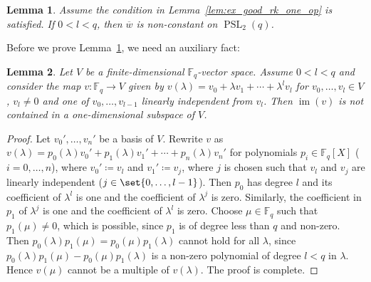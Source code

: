 \documentclass[a4paper,11pt]{amsproc}
\newcommand{\finfield}{\mathbb{F}}%
\DeclareMathOperator{\PSL}{PSL}%
\DeclareMathOperator{\im}{im}%
\theoremstyle{plain}
\newtheorem{lemma}{Lemma}[section]
\theoremstyle{definition}
\begin{document}
	\begin{lemma}\label{lem:poly_mthd}
		Assume the condition in Lemma~\ref{lem:ex_good_rk_one_op} is satisfied. If $0<l<q$, then $\overline{w}$ is non-constant on $\PSL_2(q)$.
	\end{lemma}
	
	Before we prove Lemma~\ref{lem:poly_mthd}, we need an auxiliary fact:
	
	\begin{lemma}\label{lem:poly_non_const}
		Let $V$ be a finite-dimensional $\finfield_q$-vector space. Assume $0<l<q$ and consider the map $v\colon \finfield_q\to V$ given by $v(\lambda)=v_0+\lambda v_1+\cdots+\lambda^l v_l$ for $v_0,\ldots,v_l\in V$, $v_l\neq 0$ and one of $v_0,\ldots,v_{l-1}$ linearly independent from $v_l$. Then $\im(v)$ is not contained in a one-dimensional subspace of $V$.
	\end{lemma}
	
	\begin{proof}
		Let $v_0',\ldots,v_n'$ be a basis of $V$. Rewrite $v$ as $v(\lambda)=p_0(\lambda)v_0'+p_1(\lambda)v_1'+\cdots+p_n(\lambda)v_n'$ for polynomials $p_i\in\finfield_q[X]$ ($i=0,\ldots,n$), where $v_0'\coloneqq v_l$ and $v_1'\coloneqq v_j$, where $j$ is chosen such that $v_l$ and $v_j$ are linearly independent ($j\in\set{0,\ldots,l-1}$). Then $p_0$ has degree $l$ and its coefficient of $\lambda^l$ is one and the coefficient of $\lambda^j$ is zero. Similarly, the coefficient in $p_1$ of $\lambda^j$ is one and the coefficient of $\lambda^l$ is zero.
		Choose $\mu\in\finfield_q$ such that $p_1(\mu)\neq 0$, which is possible, since $p_1$ is of degree less than $q$ and non-zero. Then $p_0(\lambda)p_1(\mu)=p_0(\mu)p_1(\lambda)$ cannot hold for all $\lambda$, since $p_0(\lambda)p_1(\mu)-p_0(\mu)p_1(\lambda)$ is a non-zero polynomial of degree $l<q$ in $\lambda$. Hence $v(\mu)$ cannot be a multiple of $v(\lambda)$. The proof is complete.
	\end{proof}
	
\end{document}
